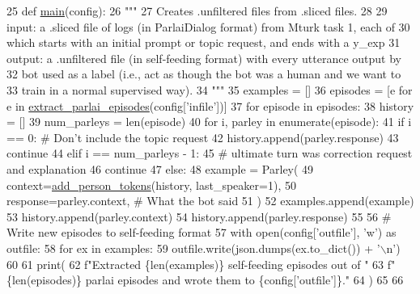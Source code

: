 \begin{DoxyCode}
25 \textcolor{keyword}{def }\hyperlink{namespaceprojects_1_1self__feeding_1_1scripts_1_1convert__sliced__to__unfiltered_a552f368b316e70524ec9118b03841486}{main}(config):
26     \textcolor{stringliteral}{"""}
27 \textcolor{stringliteral}{    Creates .unfiltered files from .sliced files.}
28 \textcolor{stringliteral}{}
29 \textcolor{stringliteral}{    input: a .sliced file of logs (in ParlaiDialog format) from Mturk task 1, each of}
30 \textcolor{stringliteral}{        which starts with an initial prompt or topic request, and ends with a y\_exp}
31 \textcolor{stringliteral}{    output: a .unfiltered file (in self-feeding format) with every utterance output by}
32 \textcolor{stringliteral}{        bot used as a label (i.e., act as though the bot was a human and we want to}
33 \textcolor{stringliteral}{        train in a normal supervised way).}
34 \textcolor{stringliteral}{    """}
35     examples = []
36     episodes = [e \textcolor{keywordflow}{for} e \textcolor{keywordflow}{in} \hyperlink{namespaceprojects_1_1self__feeding_1_1utils_a7bfa2fe610a2d0da7968b1a2662e0c23}{extract\_parlai\_episodes}(config[\textcolor{stringliteral}{'infile'}])]
37     \textcolor{keywordflow}{for} episode \textcolor{keywordflow}{in} episodes:
38         history = []
39         num\_parleys = len(episode)
40         \textcolor{keywordflow}{for} i, parley \textcolor{keywordflow}{in} enumerate(episode):
41             \textcolor{keywordflow}{if} i == 0:  \textcolor{comment}{# Don't include the topic request}
42                 history.append(parley.response)
43                 \textcolor{keywordflow}{continue}
44             \textcolor{keywordflow}{elif} i == num\_parleys - 1:
45                 \textcolor{comment}{# ultimate turn was correction request and explanation}
46                 \textcolor{keywordflow}{continue}
47             \textcolor{keywordflow}{else}:
48                 example = Parley(
49                     context=\hyperlink{namespaceprojects_1_1self__feeding_1_1utils_a3f3d055dc6c4058057baae7b240de5ec}{add\_person\_tokens}(history, last\_speaker=1),
50                     response=parley.context,  \textcolor{comment}{# What the bot said}
51                 )
52                 examples.append(example)
53                 history.append(parley.context)
54                 history.append(parley.response)
55 
56     \textcolor{comment}{# Write new episodes to self-feeding format}
57     with open(config[\textcolor{stringliteral}{'outfile'}], \textcolor{stringliteral}{'w'}) \textcolor{keyword}{as} outfile:
58         \textcolor{keywordflow}{for} ex \textcolor{keywordflow}{in} examples:
59             outfile.write(json.dumps(ex.to\_dict()) + \textcolor{stringliteral}{'\(\backslash\)n'})
60 
61     print(
62         f\textcolor{stringliteral}{"Extracted \{len(examples)\} self-feeding episodes out of "}
63         f\textcolor{stringliteral}{"\{len(episodes)\} parlai episodes and wrote them to \{config['outfile']\}."}
64     )
65 
66 
\end{DoxyCode}
